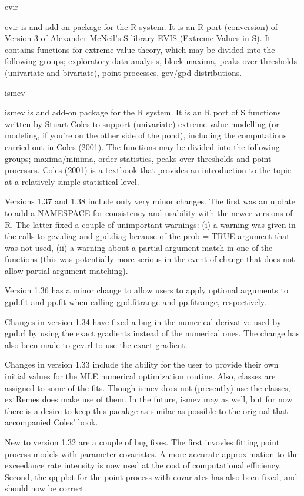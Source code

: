 \begin{frame}
evir

evir is and add-on package for the R system. It is an R port (conversion) of Version 3 of Alexander McNeil's S library EVIS (Extreme Values in S). It contains functions for extreme value theory, which may be divided into the following groups; exploratory data analysis, block maxima, peaks over thresholds (univariate and bivariate), point processes, gev/gpd distributions.

ismev

ismev is and add-on package for the R system. It is an R port of S functions written by Stuart Coles to support (univariate) extreme value modelling (or modeling, if you're on the other side of the pond), including the computations carried out in Coles (2001). The functions may be divided into the following groups; maxima/minima, order statistics, peaks over thresholds and point processes. Coles (2001) is a textbook that provides an introduction to the topic at a relatively simple statistical level.

Versions 1.37 and 1.38 include only very minor changes. The first was an update to add a NAMESPACE for consistency and usability with the newer versions of R. The latter fixed a couple of unimportant warnings: (i) a warning was given in the calls to gev.diag and gpd.diag because of the prob = TRUE argument that was not used, (ii) a warning about a partial argument match in one of the functions (this was potentially more serious in the event of change that does not allow partial argument matching).

Version 1.36 has a minor change to allow users to apply optional arguments to gpd.fit and pp.fit when calling gpd.fitrange and pp.fitrange, respectively.

Changes in version 1.34 have fixed a bug in the numerical derivative used by gpd.rl by using the exact gradients instead of the numerical ones. The change has also been made to gev.rl to use the exact gradient.

Changes in version 1.33 include the ability for the user to provide their own initial values for the MLE numerical optimization routine. Also, classes are assigned to some of the fits. Though ismev does not (presently) use the classes, extRemes does make use of them. In the future, ismev may as well, but for now there is a desire to keep this pacakge as similar as possible to the original that accompanied Coles' book.

New to version 1.32 are a couple of bug fixes. The first invovles fitting point process models with parameter covariates. A more accurate approximation to the exceedance rate intensity is now used at the cost of computational efficiency. Second, the qq-plot for the point process with covariates has also been fixed, and should now be correct.
\end{frame}
